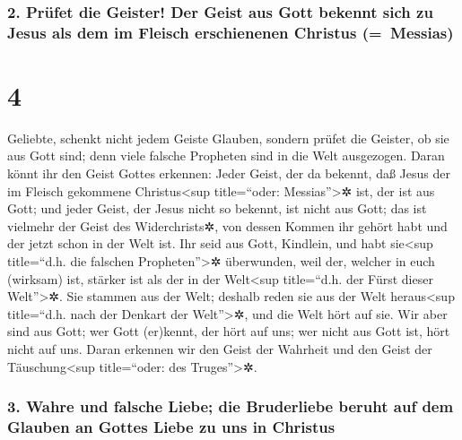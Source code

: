 \hypertarget{pruxfcfet-die-geister-der-geist-aus-gott-bekennt-sich-zu-jesus-als-dem-im-fleisch-erschienenen-christus-messias}{%
\subsubsection{2. Prüfet die Geister! Der Geist aus Gott bekennt sich zu
Jesus als dem im Fleisch erschienenen Christus
(=~Messias)}\label{pruxfcfet-die-geister-der-geist-aus-gott-bekennt-sich-zu-jesus-als-dem-im-fleisch-erschienenen-christus-messias}}

\hypertarget{section-3}{%
\section{4}\label{section-3}}

 Geliebte, schenkt nicht jedem Geiste Glauben, sondern
prüfet die Geister, ob sie aus Gott sind; denn viele falsche Propheten
sind in die Welt ausgezogen.  Daran könnt ihr den Geist
Gottes erkennen: Jeder Geist, der da bekennt, daß Jesus der im Fleisch
gekommene Christus\textless sup title=``oder: Messias''\textgreater✲
ist, der ist aus Gott;  und jeder Geist, der Jesus nicht
so bekennt, ist nicht aus Gott; das ist vielmehr der Geist des
Widerchrists✲, von dessen Kommen ihr gehört habt und der jetzt schon in
der Welt ist.  Ihr seid aus Gott, Kindlein, und habt
sie\textless sup title=``d.h. die falschen Propheten''\textgreater✲
überwunden, weil der, welcher in euch (wirksam) ist, stärker ist als der
in der Welt\textless sup title=``d.h. der Fürst dieser
Welt''\textgreater✲.  Sie stammen aus der Welt; deshalb
reden sie aus der Welt heraus\textless sup title=``d.h. nach der Denkart
der Welt''\textgreater✲, und die Welt hört auf sie.  Wir
aber sind aus Gott; wer Gott (er)kennt, der hört auf uns; wer nicht aus
Gott ist, hört nicht auf uns. Daran erkennen wir den Geist der Wahrheit
und den Geist der Täuschung\textless sup title=``oder: des
Truges''\textgreater✲.

\hypertarget{wahre-und-falsche-liebe-die-bruderliebe-beruht-auf-dem-glauben-an-gottes-liebe-zu-uns-in-christus}{%
\subsubsection{3. Wahre und falsche Liebe; die Bruderliebe beruht auf
dem Glauben an Gottes Liebe zu uns in
Christus}\label{wahre-und-falsche-liebe-die-bruderliebe-beruht-auf-dem-glauben-an-gottes-liebe-zu-uns-in-christus}}


